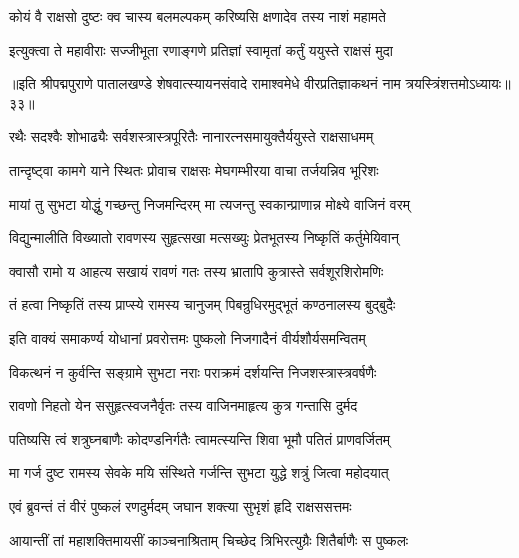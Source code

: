 \twolineshloka
{कोयं वै राक्षसो दुष्टः क्व चास्य बलमल्पकम्}
{करिष्यसि क्षणादेव तस्य नाशं महामते}%

\twolineshloka
{इत्युक्त्वा ते महावीराः सज्जीभूता रणाङ्गणे}
{प्रतिज्ञां स्वामृतां कर्तुं ययुस्ते राक्षसं मुदा}%

{॥इति श्रीपद्मपुराणे पातालखण्डे शेषवात्स्यायनसंवादे रामाश्वमेधे वीरप्रतिज्ञाकथनं नाम त्रयस्त्रिंशत्तमोऽध्यायः॥३३॥}



\twolineshloka
{रथैः सदश्वैः शोभाढ्यैः सर्वशस्त्रास्त्रपूरितैः}
{नानारत्नसमायुक्तैर्ययुस्ते राक्षसाधमम्}%

\twolineshloka
{तान्दृष्ट्वा कामगे याने स्थितः प्रोवाच राक्षसः}
{मेघगम्भीरया वाचा तर्जयन्निव भूरिशः}%

\twolineshloka
{मायां तु सुभटा योद्धुं गच्छन्तु निजमन्दिरम्}
{मा त्यजन्तु स्वकान्प्राणान्न मोक्ष्ये वाजिनं वरम्}%

\twolineshloka
{विद्युन्मालीति विख्यातो रावणस्य सुहृत्सखा}
{मत्सख्युः प्रेतभूतस्य निष्कृतिं कर्तुमेयिवान्}%

\twolineshloka
{क्वासौ रामो य आहत्य सखायं रावणं गतः}
{तस्य भ्रातापि कुत्रास्ते सर्वशूरशिरोमणिः}%

\twolineshloka
{तं हत्वा निष्कृतिं तस्य प्राप्स्ये रामस्य चानुजम्}
{पिबन्रुधिरमुद्भूतं कण्ठनालस्य बुद्बुदैः}%

\twolineshloka
{इति वाक्यं समाकर्ण्य योधानां प्रवरोत्तमः}
{पुष्कलो निजगादैनं वीर्यशौर्यसमन्वितम्}%


\twolineshloka
{विकत्थनं न कुर्वन्ति सङ्ग्रामे सुभटा नराः}
{पराक्रमं दर्शयन्ति निजशस्त्रास्त्रवर्षणैः}%

\twolineshloka
{रावणो निहतो येन ससुहृत्स्वजनैर्वृतः}
{तस्य वाजिनमाहृत्य कुत्र गन्तासि दुर्मद}%

\twolineshloka
{पतिष्यसि त्वं शत्रुघ्नबाणैः कोदण्डनिर्गतैः}
{त्वामत्स्यन्ति शिवा भूमौ पतितं प्राणवर्जितम्}%

\twolineshloka
{मा गर्ज दुष्ट रामस्य सेवके मयि संस्थिते}
{गर्जन्ति सुभटा युद्धे शत्रुं जित्वा महोदयात्}%


\twolineshloka
{एवं ब्रुवन्तं तं वीरं पुष्कलं रणदुर्मदम्}
{जघान शक्त्या सुभृशं हृदि राक्षससत्तमः}%

\twolineshloka
{आयान्तीं तां महाशक्तिमायसीं काञ्चनाश्रिताम्}
{चिच्छेद त्रिभिरत्युग्रैः शितैर्बाणैः स पुष्कलः}%

